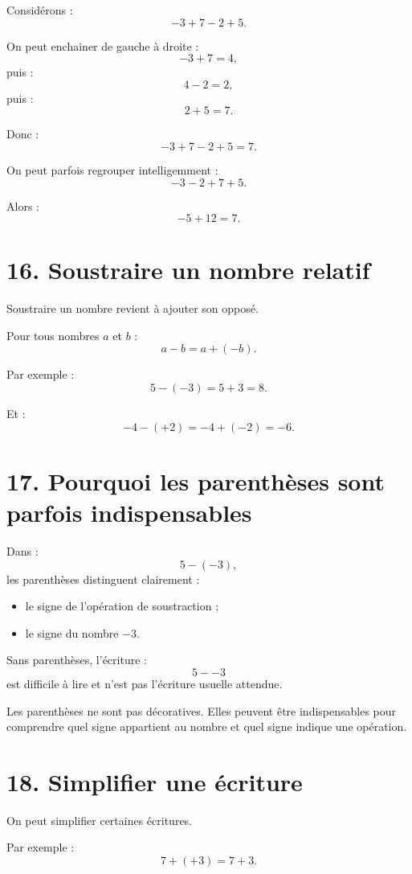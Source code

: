 Considérons :
\[
-3+7-2+5.
\]

On peut enchainer de gauche à droite :
\[
-3+7=4,
\]
puis :
\[
4-2=2,
\]
puis :
\[
2+5=7.
\]

Donc :
\[
\boxed{-3+7-2+5=7}.
\]

On peut parfois regrouper intelligemment :
\[
-3-2+7+5.
\]

Alors :
\[
-5+12=7.
\]

\section{16. Soustraire un nombre relatif}

Soustraire un nombre revient à ajouter son opposé.

\begin{propriete}
Pour tous nombres $a$ et $b$ :
\[
a-b=a+(-b).
\]
\end{propriete}

Par exemple :
\[
5-(-3)
=
5+3
=
8.
\]

Et :
\[
-4-(+2)
=
-4+(-2)
=
-6.
\]

\section{17. Pourquoi les parenthèses sont parfois indispensables}

Dans :
\[
5-(-3),
\]
les parenthèses distinguent clairement :
\begin{itemize}
\item le signe de l'opération de soustraction ;
\item le signe du nombre $-3$.
\end{itemize}

Sans parenthèses, l'écriture :
\[
5--3
\]
est difficile à lire et n'est pas l'écriture usuelle attendue.

\begin{attention}
Les parenthèses ne sont pas décoratives. Elles peuvent être indispensables pour comprendre quel signe appartient au nombre et quel signe indique une opération.
\end{attention}

\section{18. Simplifier une écriture}

On peut simplifier certaines écritures.

Par exemple :
\[
7+(+3)=7+3.
\]

